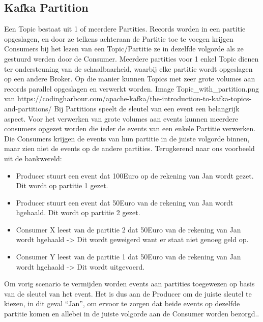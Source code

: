 \subsection{Kafka Partition}
Een Topic bestaat uit 1 of meerdere Partities. Records worden in een partitie opgeslagen, en door ze telkens achteraan de Partitie toe te voegen krijgen Consumers bij het lezen van een Topic/Partitie ze in dezelfde volgorde als ze gestuurd werden door de Consumer.
Meerdere partities voor 1 enkel Topic dienen ter ondersteuning van de schaalbaarheid, waarbij elke partitie wordt opgeslagen op een andere Broker. Op die manier kunnen Topics met zeer grote volumes aan records parallel opgeslagen en verwerkt worden.
\newline
\newline
Image Topic_with_partition.png van https://codingharbour.com/apache-kafka/the-introduction-to-kafka-topics-and-partitions/
\newline
\newline
Bij Partitions speelt de sleutel van een event een belangrijk aspect. Voor het verwerken van grote volumes aan events kunnen meerdere consumers opgezet worden die ieder de events van een enkele Partitie verwerken. Die Consumers krijgen de events van hun partitie in de juiste volgorde binnen, maar zien niet de events op de andere partities. Terugkerend naar ons voorbeeld uit de bankwereld:
\begin{itemize}
    \item Producer stuurt een event dat 100Euro op de rekening van Jan wordt gezet. Dit wordt op partitie 1 gezet.
    \item Producer stuurt een event dat 50Euro van de rekening van Jan wordt hgehaald. Dit wordt op partitie 2 gezet.
    \item Consumer X leest van de partitie 2 dat 50Euro van de rekening van Jan wordt hgehaald -> Dit wordt geweigerd want er staat niet genoeg geld op.
    \item Consumer Y leest van de partitie 1 dat 50Euro van de rekening van Jan wordt hgehaald -> Dit wordt uitgevoerd.
\end{itemize}

Om vorig scenario te vermijden worden events aan partities toegewezen op basis van de sleutel van het event. Het is dus aan de Producer om de juiste sleutel te kiezen, in dit geval ``Jan'', om ervoor te zorgen dat beide events op dezelfde partitie komen en allebei in de juiste volgorde aan de Consumer worden bezorgd..
\textcite{Harbour2023}
\newline
\newline


